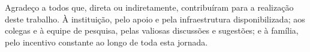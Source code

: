 
Agradeço a todos que, direta ou indiretamente, contribuíram para a realização deste trabalho. À instituição, pelo apoio e pela infraestrutura disponibilizada; aos colegas e à equipe de pesquisa, pelas valiosas discussões e sugestões; e à família, pelo incentivo constante ao longo de toda esta jornada.